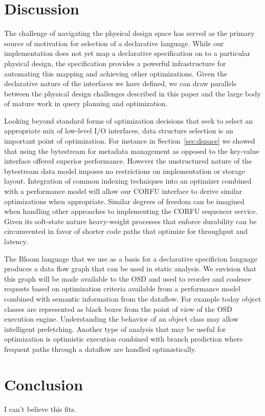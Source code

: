 \section{Discussion}
\label{sec:opts}

The challenge of navigating the physical design space has served as the
primary source of motivation for selection of a declarative language.  While
our implementation does not yet map a declarative specification on to a
particular physical design, the specification provides a powerful
infrastructure for automating this mapping and achieving other optimizations.
Given the declarative nature of the interfaces we have defined, we can draw
parallels between the physical design challenges described in this paper and
the large body of mature work in query planning and optimization.

Looking beyond standard forms of optimization decisions that seek to select
an appropriate mix of low-level I/O interfaces, data structure selection is an
important point of optimization. For instance in Section~\ref{sec:dspace} we
showed that using the bytestream for metadata management as opposed to the
key-value interface offered superior performance. However the unstructured
nature of the bytestream data model imposes no restrictions on implementation
or storage layout. Integration of common indexing techniques into an optimizer
combined with a performance model will allow our CORFU interface to derive
similar optimizations when appropriate. Similar degrees of freedom can be
imagined when handling other approaches to implementing the CORFU sequencer
service. Given its soft-state nature heavy-weight processes that enforce
durability can be circumvented in favor of shorter code paths that optimize
for throughput and latency.

The Bloom language that we use as a basis for a declarative specificion
language produces a data flow graph that can be used in static analysis. We
envision that this graph will be made available to the OSD and used to reorder
and coalesce requests based on optimization criteria available from a
performance model combined with semantic information from the dataflow. For
example today object classes are represented as black boxes from the point of
view of the OSD execution engine.  Understanding the behavior of an object
class may allow intelligent prefetching. Another type of analysis that may be
useful for optimization is optimistic execution combined with branch
prediction where frequent paths through a dataflow are handled optimistically.

\section{Conclusion}

I can't believe this fits.
